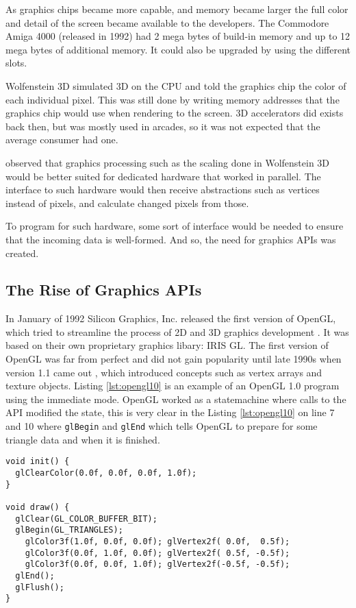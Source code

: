 As graphics chips became more capable, and memory became larger the full color and detail of the screen became available to the developers.
The Commodore Amiga 4000 (released in 1992) had 2 mega bytes of build-in memory and up to 12 mega bytes of additional memory.
It could also be upgraded by using the different slots.

Wolfenstein 3D simulated 3D on the \gls{CPU} and told the graphics chip the color of each individual pixel.
This was still done by writing memory addresses that the graphics chip would use when rendering to the screen.
3D accelerators did exists back then, but was mostly used in arcades, so it was not expected that the average consumer had one.

 observed that graphics processing such as the scaling done in Wolfenstein 3D would be better suited for dedicated hardware that worked in parallel.
The interface to such hardware would then receive abstractions such as vertices instead of pixels, and calculate changed pixels from those.

To program for such hardware, some sort of interface would be needed to ensure that the incoming data is well-formed.
And so, the need for graphics \glspl{API} was created.


\subsection{The Rise of Graphics \acs{API}s} 

In January of 1992 Silicon Graphics, Inc. released the first version of OpenGL, which tried to streamline the process of 2D and 3D graphics development \cite{segal1994opengl}.
It was based on their own proprietary graphics libary: \gls{IRIS GL}.
The first version of OpenGL was far from perfect and did not gain popularity until late 1990s when version 1.1 came out \cite{kronos????history}, which introduced concepts such as vertex arrays and texture objects.
Listing \ref{lst:opengl10} is an example of an OpenGL 1.0 program using the immediate mode.
OpenGL worked as a statemachine where calls to the \gls{API} modified the state, this is very clear in the Listing \ref{lst:opengl10} on line 7 and 10 where \texttt{glBegin} and \texttt{glEnd} which tells OpenGL to prepare for some triangle data and when it is finished.

\begin{lstlisting}[language={[ANSI]C}, caption={OpenGL 1.0 program written in C, that renders a triangle with different colors on the points, and linear interpolation between the colors. This method uses the fixed pipeline to render the triangle. A method which has been deprecated since OpenGL 3.0.}, label={lst:opengl10}]
void init() {
  glClearColor(0.0f, 0.0f, 0.0f, 1.0f);
}

void draw() {
  glClear(GL_COLOR_BUFFER_BIT);
  glBegin(GL_TRIANGLES);
    glColor3f(1.0f, 0.0f, 0.0f); glVertex2f( 0.0f,  0.5f);
    glColor3f(0.0f, 1.0f, 0.0f); glVertex2f( 0.5f, -0.5f);
    glColor3f(0.0f, 0.0f, 1.0f); glVertex2f(-0.5f, -0.5f);
  glEnd();
  glFlush();
}
\end{lstlisting}

